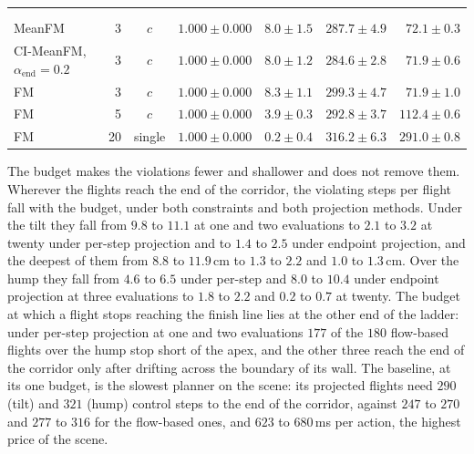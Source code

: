 \begin{table}[htpb]
\begin{tabularx}{\linewidth}{@{}L r c rrrr@{}}
     &  &  &  &  &  &  \\
    \addlinespace[3pt]
    \\
    MeanFM & 3 & $c$ & $1.000 \pm 0.000$ & $8.0 \pm 1.5$ & $287.7 \pm 4.9$ & $72.1 \pm 0.3$ \\
    CI-MeanFM, $\alpha_{\mathrm{end}}=0.2$ & 3 & $c$ & $1.000 \pm 0.000$ & $8.0 \pm 1.2$ & $284.6 \pm 2.8$ & $71.9 \pm 0.6$ \\
    FM & 3 & $c$ & $1.000 \pm 0.000$ & $8.3 \pm 1.1$ & $299.3 \pm 4.7$ & $71.9 \pm 1.0$ \\
    FM & 5 & $c$ & $1.000 \pm 0.000$ & $3.9 \pm 0.3$ & $292.8 \pm 3.7$ & $112.4 \pm 0.6$ \\
    FM & 20 & single & $1.000 \pm 0.000$ & $0.2 \pm 0.4$ & $316.2 \pm 6.3$ & $291.0 \pm 0.8$ \\
    \bottomrule
  \end{tabularx}
\end{table}

The budget makes the violations fewer and shallower and does not remove them. Wherever the flights reach
the end of the corridor, the violating steps per flight fall with the budget, under both constraints and
both projection methods. Under the tilt they fall from $9.8$ to $11.1$ at one and two evaluations to $2.1$
to $3.2$ at twenty under per-step projection and to $1.4$ to $2.5$ under endpoint projection, and the
deepest of them from $8.8$ to $11.9$\,cm to $1.3$ to $2.2$ and $1.0$ to $1.3$\,cm. Over the hump they fall
from $4.6$ to $6.5$ under per-step and $8.0$ to $10.4$ under endpoint projection at three evaluations to
$1.8$ to $2.2$ and $0.2$ to $0.7$ at twenty. The budget at which a flight stops reaching the finish line lies
at the other end of the ladder: under per-step projection at one and two evaluations $177$ of the $180$
flow-based flights over the hump stop short of the apex, and the other three reach the end of the corridor
only after drifting across the boundary of its wall. The baseline, at its one budget, is the slowest
planner on the scene: its projected flights need $290$ (tilt) and $321$ (hump) control steps to the end of
the corridor, against $247$ to $270$ and $277$ to $316$ for the flow-based ones, and $623$ to $680$\,ms
per action, the highest price of the scene.

